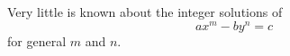 \begin{proposition}\label{eq:168}
    Very little is known about the integer solutions of
\[
    ax^m-by^n=c
\]
    for general $m$ and $n$.
\end{proposition}

